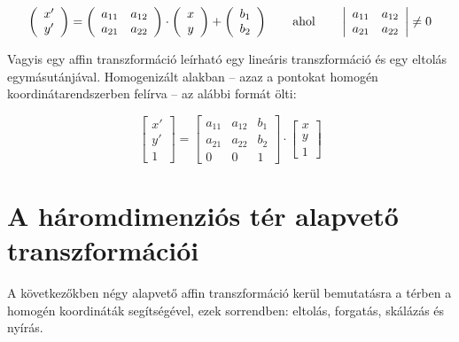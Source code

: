 \[\left(\begin{array}{c}x' \\y'\end{array}\right) = \left(\begin{array}{cc}a_{11} & a_{12}\\a_{21} & a_{22}\\\end{array}\right) \cdot \left(\begin{array}{c}x \\y\end{array}\right) + \left(\begin{array}{c}b_1 \\b_2\end{array}\right) \qquad \hbox{ahol} \qquad  \left|\begin{array}{cc}a_{11} & a_{12}\\a_{21} & a_{22}\\\end{array}\right| \neq 0\]

Vagyis egy affin transzformáció leírható egy lineáris transzformáció és egy eltolás egymásutánjával. Homogenizált alakban -- azaz a pontokat homogén koordinátarendszerben felírva -- az alábbi formát ölti:

\[\left[\begin{array}{c}x' \\y'\\ 1\end{array}\right] = \left[\begin{array}{ccc}a_{11} & a_{12} & b_1\\a_{21} & a_{22} & b_2\\0 & 0 & 1\end{array}\right] \cdot \left[\begin{array}{c}x \\ y\\ 1\end{array}\right]\]

\section{A háromdimenziós tér alapvető transzformációi}

A következőkben négy alapvető affin transzformáció kerül bemutatásra a térben a homogén koordináták segítségével, ezek sorrendben: eltolás, forgatás, skálázás és nyírás.

